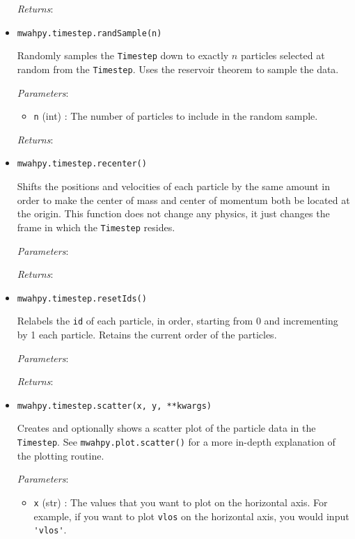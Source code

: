 \documentclass{article}
\begin{document}
\begin{itemize}
\begin{itemize}
\end{itemize}

\textit{Returns}: 



\item \verb!mwahpy.timestep.randSample(n)!

Randomly samples the \verb!Timestep! down to exactly $n$ particles selected at random from the \verb!Timestep!. Uses the reservoir theorem to sample the data.

\textit{Parameters}: \begin{itemize}

\item \verb!n! (int) : The number of particles to include in the random sample.

\end{itemize}

\textit{Returns}: 



\item \verb!mwahpy.timestep.recenter()!

Shifts the positions and velocities of each particle by the same amount in order to make the center of mass and center of momentum both be located at the origin. This function does not change any physics, it just changes the frame in which the \verb!Timestep! resides.

\textit{Parameters}: 

\textit{Returns}: 



\item \verb!mwahpy.timestep.resetIds()!

Relabels the \verb!id! of each particle, in order, starting from 0 and incrementing by 1 each particle. Retains the current order of the particles. 

\textit{Parameters}: 

\textit{Returns}: 



\item \verb!mwahpy.timestep.scatter(x, y, **kwargs)!

Creates and optionally shows a scatter plot of the particle data in the \verb!Timestep!. See \verb!mwahpy.plot.scatter()! for a more in-depth explanation of the plotting routine.

\textit{Parameters}: \begin{itemize}

\item \verb!x! (str) : The values that you want to plot on the horizontal axis. For example, if you want to plot \verb!vlos! on the horizontal axis, you would input \verb!'vlos'!.


\end{itemize}
\end{itemize}
\end{document}
